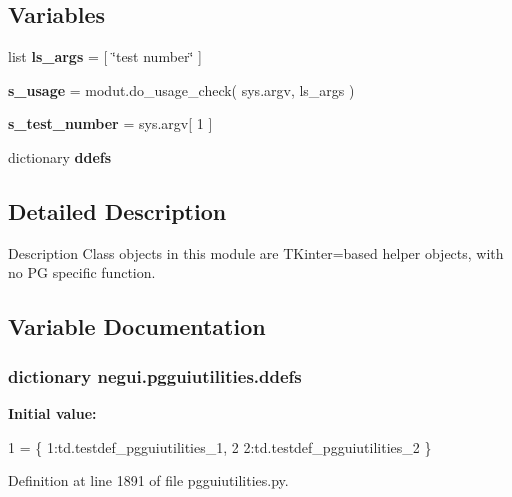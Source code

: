 \subsection*{Variables}
\begin{DoxyCompactItemize}
\item 
list {\bfseries ls\+\_\+args} = \mbox{[} \char`\"{}test number\char`\"{} \mbox{]}\hypertarget{namespacenegui_1_1pgguiutilities_a46e745e9f96185d89c4b1e47e9e9cfbe}{}\label{namespacenegui_1_1pgguiutilities_a46e745e9f96185d89c4b1e47e9e9cfbe}

\item 
{\bfseries s\+\_\+usage} = modut.\+do\+\_\+usage\+\_\+check( sys.\+argv, ls\+\_\+args )\hypertarget{namespacenegui_1_1pgguiutilities_ac555db6439aacbf9bbcf963914197974}{}\label{namespacenegui_1_1pgguiutilities_ac555db6439aacbf9bbcf963914197974}

\item 
{\bfseries s\+\_\+test\+\_\+number} = sys.\+argv\mbox{[} 1 \mbox{]}\hypertarget{namespacenegui_1_1pgguiutilities_a27a6c48cffe2fc5f9023b47cd8a33c45}{}\label{namespacenegui_1_1pgguiutilities_a27a6c48cffe2fc5f9023b47cd8a33c45}

\item 
dictionary {\bfseries ddefs}
\end{DoxyCompactItemize}


\subsection{Detailed Description}
\begin{DoxyVerb}Description
Class objects in this module are TKinter=based
helper objects, with no PG specific function.
\end{DoxyVerb}
 

\subsection{Variable Documentation}
\subsubsection[{\texorpdfstring{ddefs}{ddefs}}]{\setlength{\rightskip}{0pt plus 5cm}dictionary negui.\+pgguiutilities.\+ddefs}\hypertarget{namespacenegui_1_1pgguiutilities_a6d79494ef4549443848626c0def2e0a6}{}\label{namespacenegui_1_1pgguiutilities_a6d79494ef4549443848626c0def2e0a6}
{\bfseries Initial value\+:}
\begin{DoxyCode}
1 = \{ 1:td.testdef\_pgguiutilities\_1,
2             2:td.testdef\_pgguiutilities\_2 \}
\end{DoxyCode}


Definition at line 1891 of file pgguiutilities.\+py.

